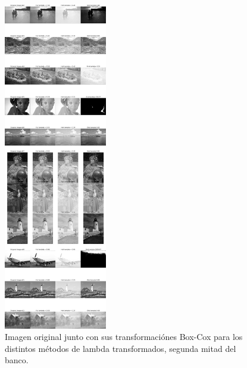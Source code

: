\begin{figure}
    \centering
    \includegraphics[width=0.4\textwidth]{figuras/img_BCI_all_2.png}
    \caption{Imagen original junto con sus transformaci\'ones Box-Cox para los distintos m\'etodos de lambda transformados, segunda mitad del banco.}
\end{figure}


